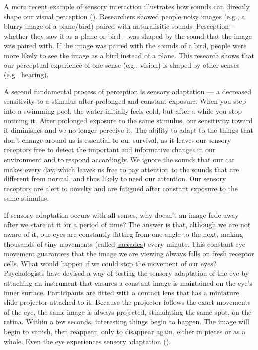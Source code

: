 \documentclass[
]{krantz}
\begin{document}
A more recent example of sensory interaction illustrates how sounds can directly shape our visual perception (). Researchers showed people noisy images (e.g., a blurry image of a plane/bird) paired with naturalisitic sounds. Perception -- whether they saw it as a plane or bird -- was shaped by the sound that the image was paired with. If the image was paired with the sounds of a bird, people were more likely to see the image as a bird instead of a plane. This research shows that our perceptual experience of one sense (e.g., vision) is shaped by other senses (e.g., hearing).

A second fundamental process of perception is \hyperref[sensory-adaptation]{sensory adaptation} --- a decreased sensitivity to a stimulus after prolonged and constant exposure. When you step into a swimming pool, the water initially feels cold, but after a while you stop noticing it. After prolonged exposure to the same stimulus, our sensitivity toward it diminishes and we no longer perceive it. The ability to adapt to the things that don't change around us is essential to our survival, as it leaves our sensory receptors free to detect the important and informative changes in our environment and to respond accordingly. We ignore the sounds that our car makes every day, which leaves us free to pay attention to the sounds that are different from normal, and thus likely to need our attention. Our sensory receptors are alert to novelty and are fatigued after constant exposure to the same stimulus.

If sensory adaptation occurs with all senses, why doesn't an image fade away after we stare at it for a period of time? The answer is that, although we are not aware of it, our eyes are constantly flitting from one angle to the next, making thousands of tiny movements (called \hyperref[saccades]{saccades}) every minute. This constant eye movement guarantees that the image we are viewing always falls on fresh receptor cells. What would happen if we could stop the movement of our eyes? Psychologists have devised a way of testing the sensory adaptation of the eye by attaching an instrument that ensures a constant image is maintained on the eye's inner surface. Participants are fitted with a contact lens that has a miniature slide projector attached to it. Because the projector follows the exact movements of the eye, the same image is always projected, stimulating the same spot, on the retina. Within a few seconds, interesting things begin to happen. The image will begin to vanish, then reappear, only to disappear again, either in pieces or as a whole. Even the eye experiences sensory adaptation ().
\end{document}
